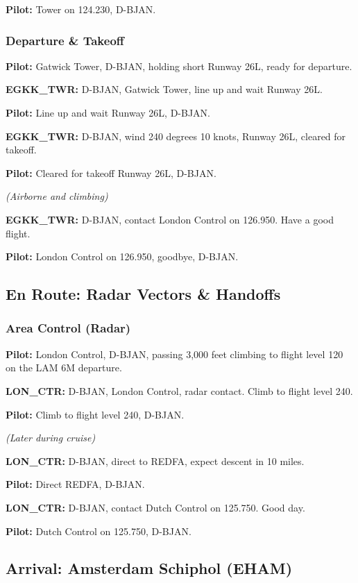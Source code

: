 \documentclass{article}
\newcommand{\callsign}{D-BJAN}
\begin{document}
\textbf{Pilot:} Tower on 124.230, \callsign.

\subsubsection*{Departure \& Takeoff}

\textbf{Pilot:} Gatwick Tower, \callsign, holding short Runway 26L, ready for departure.

\textbf{EGKK\_TWR:} \callsign, Gatwick Tower, line up and wait Runway 26L.

\textbf{Pilot:} Line up and wait Runway 26L, \callsign.

\textbf{EGKK\_TWR:} \callsign, wind 240 degrees 10 knots, Runway 26L, cleared for takeoff.

\textbf{Pilot:} Cleared for takeoff Runway 26L, \callsign.

\textit{(Airborne and climbing)}

\textbf{EGKK\_TWR:} \callsign, contact London Control on 126.950. Have a good flight.

\textbf{Pilot:} London Control on 126.950, goodbye, \callsign.

\subsection*{En Route: Radar Vectors \& Handoffs}

\subsubsection*{Area Control (Radar)}

\textbf{Pilot:} London Control, \callsign, passing 3,000 feet climbing to flight level 120 on the LAM 6M departure.

\textbf{LON\_CTR:} \callsign, London Control, radar contact. Climb to flight level 240.

\textbf{Pilot:} Climb to flight level 240, \callsign.

\textit{(Later during cruise)}

\textbf{LON\_CTR:} \callsign, direct to REDFA, expect descent in 10 miles.

\textbf{Pilot:} Direct REDFA, \callsign.

\textbf{LON\_CTR:} \callsign, contact Dutch Control on 125.750. Good day.

\textbf{Pilot:} Dutch Control on 125.750, \callsign.

\subsection*{Arrival: Amsterdam Schiphol (EHAM)}
\end{document}
